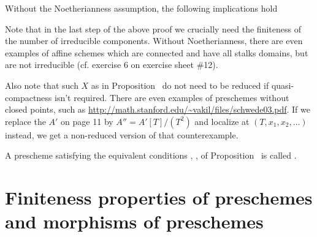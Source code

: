 \documentclass[a4paper,parskip=half,numbers=enddot, DIV=12]{scrreprt}
\begin{document}
\begin{rem}%
	Without the Noetherianness assumption, the following implications hold
	\begin{center}
	\end{center}
	Note that in the last step of the above proof we crucially need the finiteness of the number of irreducible components. Without Noetherianness, there are even examples of affine schemes which are connected and have all stalks domains, but are not irreducible (cf. exercise 6 on exercise sheet \#12).
	
	Also note that such $X$ as in Proposition~ do not need to be reduced if quasi-compactness isn't required. There are even examples of preschemes without closed points, such as \url{http://math.stanford.edu/~vakil/files/schwede03.pdf}. If we replace the $A'$ on page 11 by $A''=A'[T]/(T^2)$ and localize at $(T,x_1,x_2,\ldots)$ instead, we get a non-reduced version of that counterexample.
\end{rem}
\begin{defi}
    A prescheme satisfying the equivalent conditions , ,  of Proposition~ is called .
\end{defi}

\section{Finiteness properties of preschemes and morphisms of preschemes}
\end{document}
